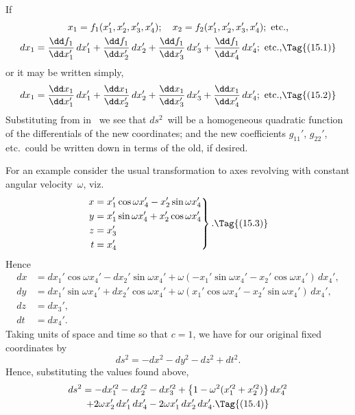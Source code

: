 \documentclass[12pt]{book}
\begin{document}
If
\begin{gather*}
  x_{1} = f_{1}(x_{1}', x_{2}', x_{3}', x_{4}');\quad
  x_{2} = f_{2}(x_{1}', x_{2}', x_{3}', x_{4}'); \text{ etc.,} \\
  dx_{1} = \frac{\dd f_{1}}{\dd x_{1}'}\, dx_{1}'
        + \frac{\dd f_{1}}{\dd x_{2}'}\, dx_{2}'
        + \frac{\dd f_{1}}{\dd x_{3}'}\, dx_{3}'
        + \frac{\dd f_{1}}{\dd x_{4}'}\, dx_{4}'; \text{ etc.,}
  \Tag{(15.1)}
\end{gather*}
or it may be written simply,
\[
dx_{1} = \frac{\dd x_{1}}{\dd x_{1}'}\, dx_{1}'
  + \frac{\dd x_{1}}{\dd x_{2}'}\, dx_{2}'
  + \frac{\dd x_{1}}{\dd x_{3}'}\, dx_{3}'
  + \frac{\dd x_{1}}{\dd x_{4}'}\, dx_{4}'; \text{ etc.,}
  \Tag{(15.2)}
\]
Substituting from  in~ we see that $ds^{2}$~will be a homogeneous
quadratic function of the differentials of the new coordinates; and the new
coefficients $g_{11}'$, $g_{22}'$, etc.\ could be written down in terms of the old, if desired.

For an example consider the usual transformation to axes revolving with
%
constant angular velocity~$\omega$, viz.
\[
\left.
\begin{aligned}
  x &= x_{1}' \cos \omega x_{4}' - x_{2}' \sin \omega x_{4}' \\
  y &= x_{1}' \sin \omega x_{4}' + x_{2}' \cos \omega x_{4}' \\
  z &= x_{3}' \\
  t &= x_{4}'
\end{aligned}
\right\}.
\Tag{(15.3)}
\]
Hence
\begin{align*}
  dx &= dx_{1}' \cos \omega x_{4}' - dx_{2}' \sin \omega x_{4}'
  + \omega(-x_{1}' \sin \omega x_{4}' - x_{2}' \cos \omega x_{4}')\, dx_{4}', \\
  dy &= dx_{1}' \sin \omega x_{4}' + dx_{2}' \cos \omega x_{4}'
  + \omega( x_{1}' \cos \omega x_{4}' - x_{2}' \sin \omega x_{4}')\, dx_{4}', \\
  dz &= dx_{3}', \\
  dt &= dx_{4}'.
\end{align*}
Taking units of space and time so that $c = 1$, we have for our original fixed
coordinates by~
\[
ds^{2} = -dx^{2} - dy^{2} - dz^{2} + dt^{2}.
\]
Hence, substituting the values found above,
\begin{multline*}
  ds^{2} = - dx_{1}'^{2} - dx_{2}'^{2} - dx_{3}'^{2} + \bigl\{1 - \omega^{2} (x_{1}'^{2} + x_{2}'^{2})\bigr\}\, dx_{4}'^{2} \\
  + 2\omega x_{2}'\, dx_{1}'\, dx_{4}' - 2\omega x_{1}'\, dx_{2}'\, dx_{4}'.
  \Tag{(15.4)}
\end{multline*}
\end{document}

